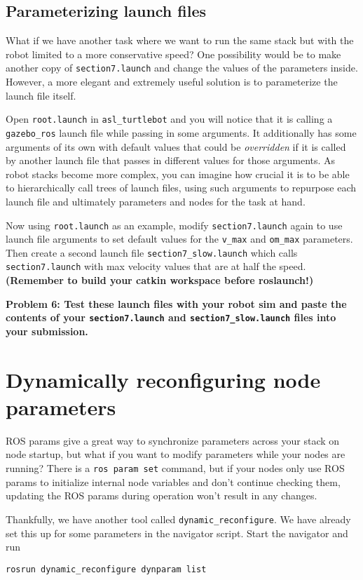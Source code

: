 \documentclass{article}
\begin{document}
\subsection{Parameterizing launch files}
What if we have another task where we want to run the same stack but with the robot limited to a more conservative speed? One possibility would be to make another copy of \texttt{section7.launch} and change the values of the parameters inside. However, a more elegant and extremely useful solution is to parameterize the launch file itself.

Open \texttt{root.launch} in \texttt{asl\_turtlebot} and you will notice that it is calling a \texttt{gazebo\_ros} launch file while passing in some arguments. It additionally has some arguments of its own with default values that could be \textit{overridden} if it is called by another launch file that passes in different values for those arguments. As robot stacks become more complex, you can imagine how crucial it is to be able to hierarchically call trees of launch files, using such arguments to repurpose each launch file and ultimately parameters and nodes for the task at hand.

Now using \texttt{root.launch} as an example, modify \texttt{section7.launch} again to use launch file arguments to set default values for the \texttt{v\_max} and \texttt{om\_max} parameters. Then create a second launch file \texttt{section7\_slow.launch} which calls \texttt{section7.launch} with max velocity values that are at half the speed. \textbf{(Remember to build your catkin workspace before roslaunch!)}

{\bf Problem 6: Test these launch files with your robot sim and paste the contents of your \texttt{section7.launch} and \texttt{section7\_slow.launch} files into your submission.}

\section{Dynamically reconfiguring node parameters}
ROS params give a great way to synchronize parameters across your stack on node startup, but what if you want to modify parameters while your nodes are running? There is a \texttt{ros param set} command, but if your nodes only use ROS params to initialize internal node variables and don't continue checking them, updating the ROS params during operation won't result in any changes.

Thankfully, we have another tool called \texttt{dynamic\_reconfigure}. We have already set this up for some parameters in the navigator script. Start the navigator and run
\begin{lstlisting}
rosrun dynamic_reconfigure dynparam list
\end{lstlisting}
\end{document}
